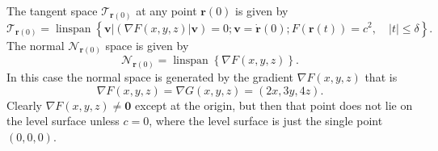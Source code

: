 \documentclass[aps,preprint]{revtex4}%
\begin{document}
The tangent space $\mathcal{T}_{\mathbf{r}\left(  0\right)  }$ at any point
$\mathbf{r}\left(  0\right)  $ is given by
\begin{equation}
\mathcal{T}_{\mathbf{r}\left(  0\right)  }=\operatorname{linspan}\left\{
\left.  \mathbf{v}\right\vert \left(  \left.  \nabla F\left(  x,y,z\right)
\right\vert \mathbf{v}\right)  =0;\mathbf{v=\dot{r}}\left(  0\right)
;F\left(  \mathbf{r}\left(  t\right)  \right)  =c^{2}\mathbf{,\quad}\left\vert
t\right\vert \leq\delta\right\}  .
\end{equation}
The normal $\mathcal{N}_{\mathbf{r}\left(  0\right)  }$ space is given by
\begin{equation}
\mathcal{N}_{\mathbf{r}\left(  0\right)  }=\operatorname{linspan}\left\{
\nabla F\left(  x,y,z\right)  \right\}  .
\end{equation}
In this case the normal space is generated by the gradient $\nabla F\left(
x,y,z\right)  $ that is
\begin{equation}
\nabla F\left(  x,y,z\right)  =\nabla G\left(  x,y,z\right)  =\left(
2x,3y,4z\right)  .
\end{equation}
Clearly $\nabla F\left(  x,y,z\right)  \neq\mathbf{0}$ except at the origin,
but then that point does not lie on the level surface unless $c=0$, where the
level surface is just the single point $\left(  0,0,0\right)  .$
\end{document}
